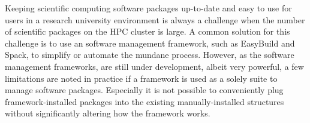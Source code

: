 \documentclass[conference]{IEEEtran}
\begin{document}
Keeping scientific computing software packages up-to-date and easy to use for users in a research university environment is always a challenge when the number of scientific packages on the HPC cluster is large.
A common solution for this challenge is to use an software management framework, such as EasyBuild\cite{geimer:14} and Spack\cite{gamblin:15}, to simplify or automate the mundane process. 
However, as the software management frameworks, are still under development, albeit very powerful, a few limitations are noted in practice if a framework is used as a solely suite to manage software packages.
Especially it is not possible to conveniently plug framework-installed packages into the existing manually-installed structures without significantly altering how the framework works. 
\end{document}
